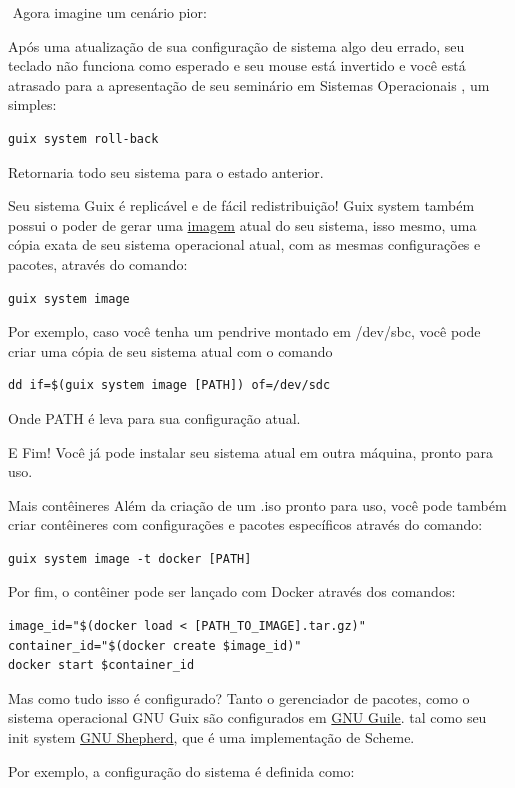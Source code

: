 \documentclass[bigger]{beamer}
\begin{document}
\begin{frame}[label={sec:orgee20b23},fragile]{⁤}
 Agora imagine um cenário pior:

Após uma atualização de sua configuração de sistema algo deu errado,
seu teclado não funciona como esperado e seu mouse está invertido e você está atrasado para a apresentação de
seu seminário em Sistemas Operacionais , um simples:
\begin{verbatim}
guix system roll-back
\end{verbatim}
Retornaria todo seu sistema para o estado anterior.
\end{frame}
\begin{frame}[label={sec:orgfc8cbdc},fragile]{Seu sistema Guix é replicável e de fácil redistribuição!}
 Guix system também possui o poder de gerar uma \href{https://guix.gnu.org/manual/en/html\_node/Invoking-guix-system.html\#index-image\_002c-creating-disk-images}{imagem} atual do seu sistema, isso mesmo, uma cópia exata de
seu sistema operacional atual, com as mesmas configurações e pacotes, através do comando:
\begin{verbatim}
guix system image
\end{verbatim}
Por exemplo, caso você tenha um pendrive montado em /dev/sbc, você pode criar uma cópia de seu sistema atual
com o comando
\begin{verbatim}
dd if=$(guix system image [PATH]) of=/dev/sdc
\end{verbatim}
Onde PATH é leva para sua configuração atual.

E Fim! Você já pode instalar seu sistema atual em outra máquina, pronto para uso.
\end{frame}
\begin{frame}[label={sec:org817dbb6},fragile]{Mais contêineres}
 Além da criação de um .iso pronto para uso, você pode também criar contêineres com configurações e pacotes
específicos através do comando:
\begin{verbatim}
guix system image -t docker [PATH]
\end{verbatim}

Por fim, o contêiner pode ser lançado com Docker através dos comandos:
\begin{verbatim}
image_id="$(docker load < [PATH_TO_IMAGE].tar.gz)"
container_id="$(docker create $image_id)"
docker start $container_id
\end{verbatim}
\end{frame}
\begin{frame}[label={sec:org27e927e}]{Mas como tudo isso é configurado?}
Tanto o gerenciador de pacotes, como o sistema operacional GNU Guix são configurados em \href{https://www.gnu.org/software/guile/}{GNU Guile}. tal como
seu init system \href{https://www.gnu.org/software/shepherd/}{GNU Shepherd}, que é uma implementação de Scheme.

Por exemplo, a configuração do sistema é definida como:
\end{frame}
\end{document}
